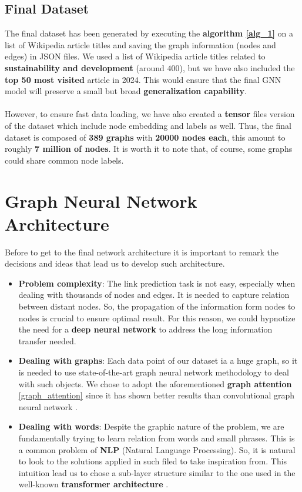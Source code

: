 \documentclass[11pt]{article}
\begin{document}
	\subsection{Final Dataset}
	The final dataset has been generated by executing the \textbf{algorithm \ref{alg_1}} on a list of Wikipedia article titles and saving the graph information (nodes and edges) in JSON files.
	We used a list of Wikipedia article titles related to \textbf{sustainability and development} (around $400$), but we have also included the \textbf{top 50 most visited} article in 2024.
	This would ensure that the final GNN model will preserve a small but broad \textbf{generalization capability}.\\\\
	However, to ensure fast data loading, we have also created a \textbf{tensor} files version of the dataset which include node embedding and labels as well.
	Thus, the final dataset is composed of \textbf{389 graphs} with \textbf{20000 nodes each}, this amount to roughly \textbf{7 million of nodes}. It is worth it to note that, of course, some graphs could share common node labels.\\
	
	
	\section{Graph Neural Network Architecture}
	Before to get to the final network architecture it is important to remark the decisions and ideas that lead us to develop such architecture. 
	\begin{itemize}
		\item{\textbf{Problem complexity}}: The link prediction task is not easy, especially when dealing with thousands of nodes and edges. It is needed to capture relation between distant nodes. So, the propagation of the information form nodes to nodes is crucial to ensure optimal result. For this reason, we could hypnotize the need for a \textbf{deep neural network} to address the long information transfer needed. 
		
		\item{\textbf{Dealing with graphs}}: Each data point of our dataset ia a huge graph, so it is needed to use state-of-the-art graph neural network methodology to deal with such objects. We chose to adopt the aforementioned \textbf{graph attention} \cite{veličković2018graphattentionnetworks} \ref{graph_attention} since it has shown better results than convolutional graph neural network \cite{kipf2017semisupervisedclassificationgraphconvolutional}. 
		
		\item{\textbf{Dealing with words}}: Despite the graphic nature of the problem, we are fundamentally trying to learn relation from words and small phrases. This is a common problem of \textbf{NLP} (Natural Language Processing). So, it is natural to look to the solutions applied in such filed to take inspiration from. This intuition lead us to chose a sub-layer structure similar to the one used in the well-known \textbf{transformer architecture} \cite{vaswani2023attentionneed}.   
	\end{itemize}
	
\end{document}
